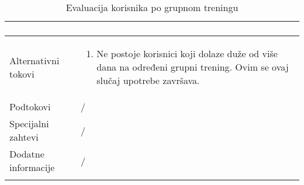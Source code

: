 \documentclass[../grupniTreninzi.tex]{subfiles}
\begin{document}
\begin{longtable}{| p{} | p{} |}
\begin{enumerate}
    \end{enumerate}\\
\hline
    Alternativni tokovi & 
    \begin{enumerate}
        \item Ne postoje korisnici koji dolaze duže od više dana na određeni grupni trening. Ovim se ovaj slučaj upotrebe završava.
    \end{enumerate}\\
\hline
    Podtokovi & /\\
\hline
    Specijalni zahtevi & /\\
\hline
    Dodatne informacije & /\\
\hline
\caption{Evaluacija korisnika po grupnom treningu} %
\end{longtable}
\end{document}
